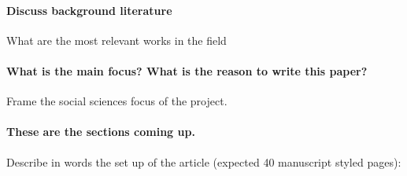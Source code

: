 \paragraph{Discuss background literature}
	What are the most relevant works in the field

\paragraph{What is the main focus? What is the reason to write this paper?}
	Frame the social sciences focus of the project.

\paragraph{These are the sections coming up.}
	Describe in words the set up of the article (expected 40 manuscript styled pages):
